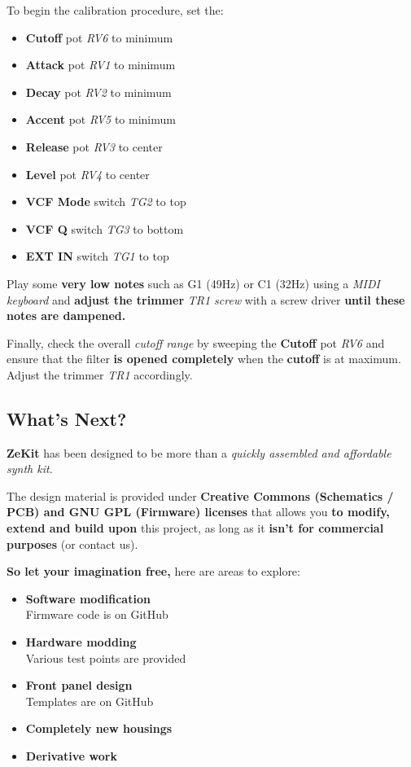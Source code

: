 \documentclass{scrartcl}
\begin{document}
To begin the calibration procedure, set the:
\begin{itemize}
    \item \textbf{Cutoff} pot \emph{RV6} to minimum
    \item \textbf{Attack} pot \emph{RV1} to minimum
    \item \textbf{Decay} pot \emph{RV2} to minimum
    \item \textbf{Accent} pot \emph{RV5} to minimum
    \item \textbf{Release} pot \emph{RV3} to center
    \item \textbf{Level} pot \emph{RV4} to center
    \item \textbf{VCF Mode} switch \emph{TG2} to top
    \item \textbf{VCF Q} switch \emph{TG3} to bottom
    \item \textbf{EXT IN} switch \emph{TG1} to top
\end{itemize}

\vspace{0.25cm}
Play some \textbf{very low notes} such as G1 (49Hz) or C1 (32Hz) using a \emph{MIDI keyboard} and \textbf{adjust the trimmer} \emph{TR1 screw} with a screw driver \textbf{until these notes are dampened.}

Finally, check the overall \emph{cutoff range} by sweeping the \textbf{Cutoff} pot \emph{RV6} and ensure that the filter \textbf{is opened completely} when the \textbf{cutoff} is at maximum. Adjust the trimmer \emph{TR1} accordingly.

\pagebreak
\subsection{What's Next?}

\textbf{ZeKit} has been designed to be more than a \emph{quickly assembled and affordable synth kit.}

The design material is provided under \textbf{Creative Commons (Schematics / PCB) and GNU GPL (Firmware) licenses} that allows you \textbf{to modify, extend and build upon} this project,
as long as it \textbf{isn't for commercial purposes} (or contact us).

\textbf{So let your imagination free,} here are areas to explore:

\begin{itemize}
    \item \textbf{Software modification} \\
          Firmware code is on GitHub
    \item \textbf{Hardware modding} \\
          Various test points are provided
    \item \textbf{Front panel design} \\
          Templates are on GitHub
    \item \textbf{Completely new housings}
    \item \textbf{Derivative work}
\end{itemize}
\end{document}
